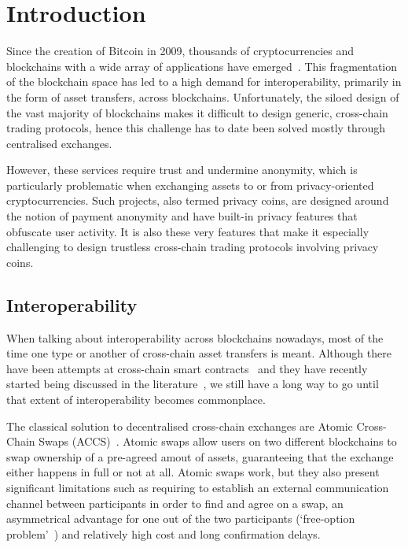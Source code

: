 
\chapter{Introduction}
Since the creation of Bitcoin in 2009, thousands of cryptocurrencies and blockchains with a wide array of applications have emerged~\cite{CoinGecko}.
This fragmentation of the blockchain space has led to a high demand for interoperability, primarily in the form of asset transfers, across blockchains.
Unfortunately, the siloed design of the vast majority of blockchains makes it difficult to design generic, cross-chain trading protocols, hence this challenge has to date been solved mostly through centralised exchanges.

However, these services require trust and undermine anonymity, which is particularly problematic when exchanging assets to or from privacy-oriented cryptocurrencies.
Such projects, also termed privacy coins, are designed around the notion of payment anonymity and have built-in privacy features that obfuscate user activity.
It is also these very features that make it especially challenging to design trustless cross-chain trading protocols involving privacy coins.

\section{Interoperability}

When talking about interoperability across blockchains nowadays, most of the time one type or another of cross-chain asset transfers is meant.
Although there have been attempts at cross-chain smart contracts~\cite{GitHubtrustlesscrosssysteminteractionIon} and they have recently started being discussed in the literature~\cite{nissl2020crossblockchain}, we still have a long way to go until that extent of interoperability becomes commonplace.

The classical solution to decentralised cross-chain exchanges are Atomic Cross-Chain Swaps (ACCS)~\cite{herlihy2018accs}.
Atomic swaps allow users on two different blockchains to swap ownership of a pre-agreed amout of assets, guaranteeing that the exchange either happens in full or not at all.
Atomic swaps work, but they also present significant limitations such as requiring to establish an external communication channel between participants in order to find and agree on a swap, an asymmetrical advantage for one out of the two participants (`free-option problem'~\cite{HomerenprojectrenWikiGitHub}) and relatively high cost and long confirmation delays.

